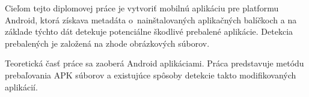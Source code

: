 Cieľom tejto diplomovej práce je vytvoriť mobilnú aplikáciu pre platformu Android, ktorá získava metadáta o~nainštalovaných aplikačných balíčkoch a na základe týchto dát detekuje potenciálne škodlivé prebalené aplikácie. Detekcia prebalených je založená na zhode obrázkových súborov.

\noindent Teoretická časť práce sa zaoberá Android aplikáciami. Práca predstavuje metódu prebaľovania APK súborov a existujúce spôsoby detekcie takto modifikovaných aplikácií.

